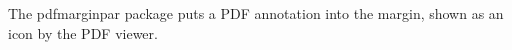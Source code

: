 \documentclass[11pt]{article}\usepackage[paperwidth=12cm,paperheight=7cm,margin=1cm,marginparwidth=1.6cm,marginparsep=2mm]{geometry}\pagestyle{empty}\usepackage{lipsum}
\begin{document}
The pdfmarginpar package puts a PDF annotation into the margin, shown as an icon by the PDF viewer.
\end{document}
